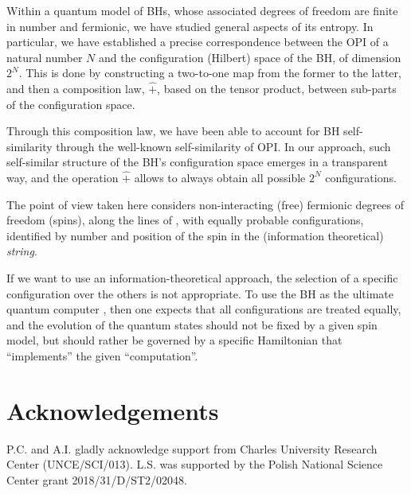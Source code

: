 \documentclass[aps,prd,showkeys,nofootinbib,superscriptaddress]{revtex4-2}
\begin{document}
Within a quantum model of BHs, whose associated degrees of freedom are finite in number and fermionic, we have studied general aspects of its entropy. In particular, we have established a precise correspondence between the OPI of a natural number $N$ and the configuration (Hilbert) space of the BH, of dimension $2^N$. This is done by constructing a two-to-one map from the former to the latter, and then a composition law, $\hat +$, based on the tensor product, between sub-parts of the configuration space.

Through this composition law, we have been able to account for BH self-similarity through the well-known self-similarity of OPI. In our approach, such self-similar structure of the BH's configuration space emerges in a transparent way, and the operation $\hat +$ allows to always obtain all possible $2^N$ configurations.

The point of view taken here considers non-interacting (free) fermionic degrees of freedom (spins), along the lines of \cite{aischol,Xons,aismal}, with equally probable configurations, identified by number and position of the spin in the (information theoretical) \textit{string}.

If we want to use an information-theoretical approach, the selection of a specific configuration over the others is not appropriate. To use the BH as the ultimate quantum computer \cite{lloyd}, then one expects that all configurations are treated equally, and the evolution of the quantum states should not be fixed by a given spin model, but should rather be governed by a specific Hamiltonian that ``implements'' the given ``computation''.


\section*{Acknowledgements}
P.C. and A.I. gladly acknowledge support from Charles University Research Center (UNCE/SCI/013). L.S. was supported by the Polish National Science Center grant 2018/31/D/ST2/02048.

%


\end{document}
